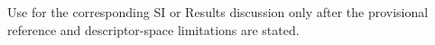 Use for the corresponding SI or Results discussion only after the provisional reference and descriptor-space limitations are stated.
